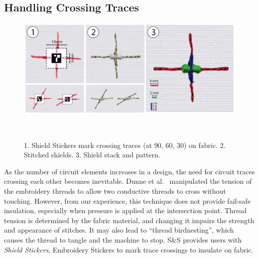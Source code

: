 \documentclass[header.tex]{subfiles}
\begin{document}
 



\subsection{Handling Crossing Traces}
\begin{figure}[t]
\centering
  \includegraphics[width=1\columnwidth]{figures/ShieldStickers.png}
  \caption{1. Shield Stickers mark crossing traces (at 90\textdegree, 60\textdegree, 30\textdegree) on fabric. 2. Stitched shields. 3. Shield stack and pattern.}~\label{fig:ShieldStickers}
  \vspace{-2.2em}
\end{figure}

As the number of circuit elements increases in a design, the need for circuit traces crossing each other becomes inevitable. Dunne et al.\ \cite{Dunne:2012:MEC:2370216.2370348} manipulated the tension of the embroidery threads to allow two conductive threads to cross without touching. However, from our experience, this technique does not provide fail-safe insulation, especially when pressure is applied at the intersection point. Thread tension is determined by the fabric material, and changing it impairs the strength and appearance of stitches. It may also lead to ``thread birdnesting'', which causes the thread to tangle and the machine to stop.  
S\&S provides users with \textit{Shield Stickers}, Embroidery Stickers to mark trace crossings to insulate on fabric.
\end{document}
